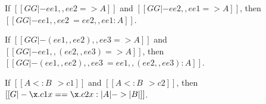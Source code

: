 \begin{corollary} \label{lemma:commu}
  If $[[GG |- ee1 ,, ee2 => A ]]$ and $[[GG |- ee2 ,, ee1 => A ]]$, then
  $[[GG |- ee1 ,, ee2 ~= ee2 ,, ee1 : A]]$.
\end{corollary}


\begin{corollary} \label{lemma:assoc}
  If $[[GG |- (ee1 ,, ee2) ,, ee3 => A  ]]$ and $[[GG |- ee1 ,, (ee2 ,, ee3) => A ]]$, then
  $[[GG |- (ee1 ,, ee2) ,, ee3 ~= ee1 ,, (ee2 ,, ee3) : A]]$.
\end{corollary}



\begin{corollary}
  \label{lemma:coercion_same}
  If $[[A <: B ~~> c1]]$ and $[[A <: B ~~> c2]]$, then $[[G |- \x . c1 x == \x . c2 x : | A | -> | B |]]$.
\end{corollary}


